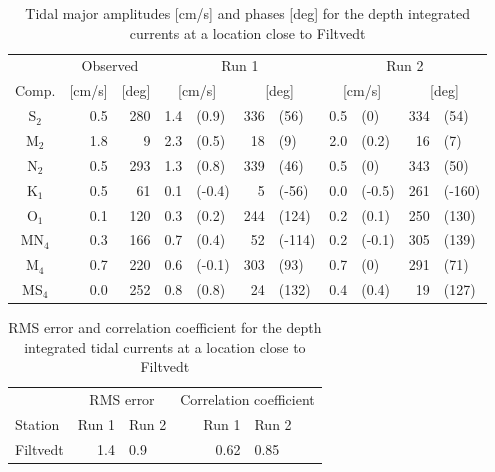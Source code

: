 \begin{table}[ht]
\caption{Tidal major amplitudes [cm/s] and phases [deg] for the depth integrated currents at a location close to Filtvedt}
\label{tab:Filtvedt}
\centering
\begin{tabular}{crrr@{ }lr@{ }lr@{ }lr@{ }l} \hline
      & \multicolumn{2}{c}{Observed} & \multicolumn{4}{c}{Run 1} & \multicolumn{4}{c}{Run 2} \\
Comp. & [cm/s] & [deg] & \multicolumn{2}{c}{[cm/s]} & \multicolumn{2}{c}{[deg]} & \multicolumn{2}{c}{[cm/s]} & \multicolumn{2}{c}{[deg]} \\ \hline 
S$_2$   &  0.5 & 280  &   1.4 & (0.9)  & 336 & (56)   &  0.5 & (0)    & 334 & (54)   \\ 
M$_2$   &  1.8 &   9  &   2.3 & (0.5)  &  18 & (9)    &  2.0 & (0.2)  &  16 & (7)    \\ 
N$_2$   &  0.5 & 293  &   1.3 & (0.8)  & 339 & (46)   &  0.5 & (0)    & 343 & (50)   \\ 
K$_1$   &  0.5 &  61  &   0.1 & (-0.4) &   5 & (-56)  &  0.0 & (-0.5) & 261 & (-160) \\ 
O$_1$   &  0.1 & 120  &   0.3 & (0.2)  & 244 & (124)  &  0.2 & (0.1)  & 250 & (130)  \\ 
MN$_4$  &  0.3 & 166  &   0.7 & (0.4)  &  52 & (-114) &  0.2 & (-0.1) & 305 & (139)  \\ 
M$_4$   &  0.7 & 220  &   0.6 & (-0.1) & 303 & (93)   &  0.7 & (0)    & 291 & (71)   \\
MS$_4$  &  0.0 & 252  &   0.8 & (0.8)  &  24 & (132)  &  0.4 & (0.4)  &  19 & (127)  \\ 
\hline 
\end{tabular}
\end{table}


\begin{table}[ht]
\caption{RMS error and correlation coefficient for the depth integrated tidal currents at a location close to Filtvedt}
\label{tab:RMS_currents}
\centering
\begin{tabular}{lrlrl} \hline
 & \multicolumn{2}{c}{RMS error} & \multicolumn{2}{c}{Correlation coefficient} \\ 
Station & Run 1 & Run 2 & \hspace{0.5cm} Run 1 & Run 2 \\ \hline 
Filtvedt   & 1.4 &   0.9 &  0.62  &  0.85 \\ \hline
\end{tabular}
\end{table}
